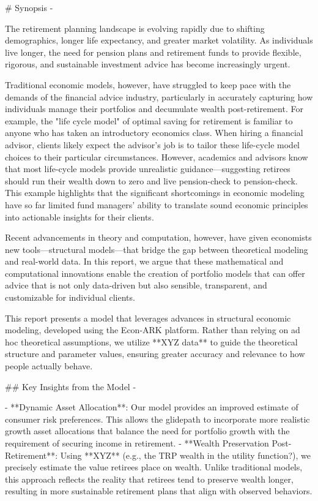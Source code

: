 
# Synopsis {-}

The retirement planning landscape is evolving rapidly due to shifting demographics, longer life expectancy, and greater market volatility. As individuals live longer, the need for pension plans and retirement funds to provide flexible, rigorous, and sustainable investment advice has become increasingly urgent.

Traditional economic models, however, have struggled to keep pace with the demands of the financial advice industry, particularly in accurately capturing how individuals manage their portfolios and decumulate wealth post-retirement. For example, the "life cycle model" of optimal saving for retirement is familiar to anyone who has taken an introductory economics class. When hiring a financial advisor, clients likely expect the advisor's job is to tailor these life-cycle model choices to their particular circumstances. However, academics and advisors know that most life-cycle models provide unrealistic guidance—suggesting retirees should run their wealth down to zero and live pension-check to pension-check. This example highlights that the significant shortcomings in economic modeling have so far limited fund managers' ability to translate sound economic principles into actionable insights for their clients.

Recent advancements in theory and computation, however, have given economists new tools—structural models—that bridge the gap between theoretical modeling and real-world data. In this report, we argue that these mathematical and computational innovations enable the creation of portfolio models that can offer advice that is not only data-driven but also sensible, transparent, and customizable for individual clients.

This report presents a model that leverages advances in structural economic modeling, developed using the Econ-ARK platform. Rather than relying on ad hoc theoretical assumptions, we utilize **XYZ data** to guide the theoretical structure and parameter values, ensuring greater accuracy and relevance to how people actually behave.

## Key Insights from the Model {-}

- **Dynamic Asset Allocation**: Our model provides an improved estimate of consumer risk preferences. This allows the glidepath to incorporate more realistic growth asset allocations that balance the need for portfolio growth with the requirement of securing income in retirement.
- **Wealth Preservation Post-Retirement**: Using **XYZ** (e.g., the TRP wealth in the utility function?), we precisely estimate the value retirees place on wealth. Unlike traditional models, this approach reflects the reality that retirees tend to preserve wealth longer, resulting in more sustainable retirement plans that align with observed behaviors.

